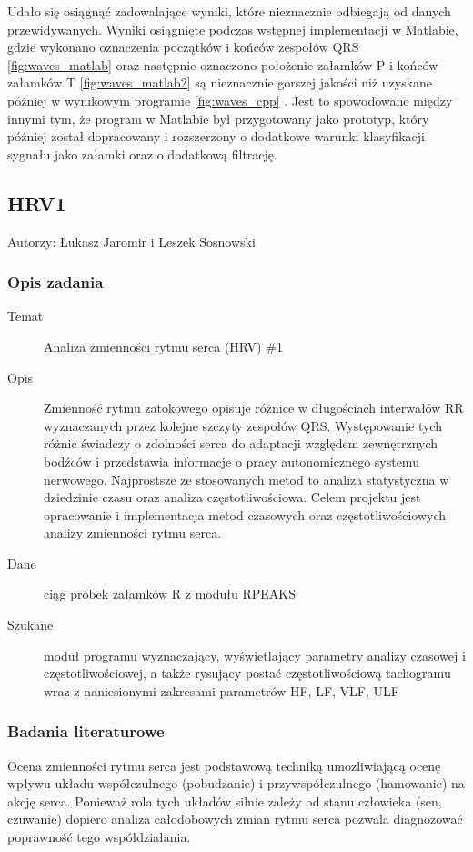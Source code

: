\documentclass[a4paper, 11pt]{article}
\begin{document}
Udało się osiągnąć zadowalające wyniki, które nieznacznie odbiegają od danych przewidywanych. 
Wyniki osiągnięte podczas wstępnej implementacji w Matlabie, gdzie wykonano oznaczenia początków i końców zespołów QRS \ref{fig:waves_matlab} oraz następnie oznaczono położenie załamków P i końców załamków T \ref{fig:waves_matlab2} są nieznacznie gorszej jakości niż uzyskane później w wynikowym programie \ref{fig:waves_cpp} . Jest to spowodowane między innymi tym, że program w Matlabie był przygotowany jako prototyp, który później został dopracowany i rozszerzony o dodatkowe warunki klasyfikacji sygnału jako załamki oraz o dodatkową filtrację.




\subsection{HRV1}
\label{sec:hrv1}

Autorzy: Łukasz Jaromir i Leszek Sosnowski
\subsubsection{Opis zadania}
\label{sec:hrv1:desc}
\begin{description}
\item[Temat] Analiza zmienności rytmu serca (HRV) \#1
\item[Opis] Zmienność rytmu zatokowego opisuje różnice w długościach interwałów RR
wyznaczanych przez kolejne szczyty zespołów QRS. Występowanie tych różnic świadczy
o zdolności serca do adaptacji względem zewnętrznych bodźców i przedstawia informacje
o pracy autonomicznego systemu nerwowego. Najprostsze ze stosowanych metod to analiza
statystyczna w dziedzinie czasu oraz analiza częstotliwościowa. Celem projektu jest
opracowanie i implementacja metod czasowych oraz częstotliwościowych analizy zmienności
rytmu serca.
\item[Dane] ciąg próbek załamków R z modułu RPEAKS
\item[Szukane] moduł programu wyznaczający, wyświetlający parametry analizy czasowej
i częstotliwościowej, a także rysujący postać częstotliwościową tachogramu wraz
z naniesionymi zakresami parametrów HF, LF, VLF, ULF
\end{description}

\subsubsection{Badania literaturowe}
\label{sec:hrv1:papers}
Ocena zmienności rytmu serca jest podstawową techniką umozliwiającą ocenę wpływu układu współczulnego (pobudzanie) i przywspółczulnego (hamowanie) na akcję serca. Ponieważ rola tych układów silnie zależy od stanu człowieka (sen, czuwanie) dopiero analiza całodobowych zmian rytmu serca pozwala diagnozować poprawność tego współdziałania.
\end{document}
